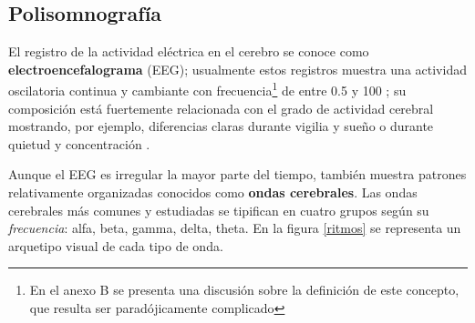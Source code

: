 


\subsection{Polisomnografía}

El registro de la actividad eléctrica en el cerebro se conoce como \textbf{electroencefalograma} 
(EEG); usualmente estos registros muestra una actividad oscilatoria continua y cambiante con 
frecuencia\footnote{En el anexo B se presenta una discusión sobre la definición de este concepto, 
que resulta ser paradójicamente complicado} de entre 0.5 y 100 \hz; su composición está fuertemente 
relacionada con el grado de actividad cerebral mostrando, por ejemplo, diferencias claras durante 
vigilia y sueño o durante quietud y concentración \cite{Clark98_2}.

Aunque el EEG es irregular la mayor parte del tiempo, también muestra patrones relativamente organizadas 
conocidos como \textbf{ondas cerebrales}. Las ondas cerebrales más comunes y estudiadas se tipifican
en cuatro grupos según su \textit{frecuencia}: alfa, beta, gamma, delta, theta.
En la figura \ref{ritmos} se representa un arquetipo visual de cada tipo de onda.

